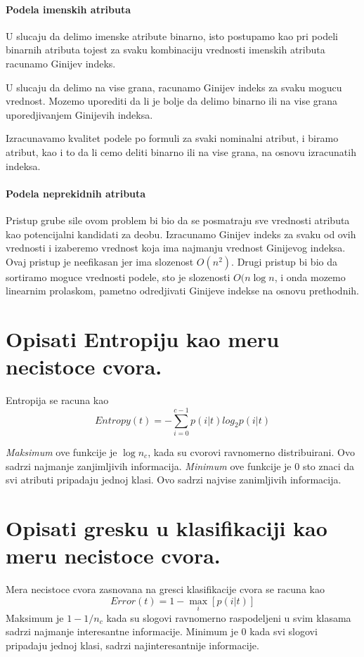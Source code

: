 \documentclass[a4paper]{article}
\begin{document}
\paragraph{Podela imenskih atributa} U slucaju da delimo imenske atribute binarno, isto postupamo
kao pri podeli binarnih atributa tojest za svaku kombinaciju vrednosti imenskih atributa racunamo
Ginijev indeks.

U slucaju da delimo na vise grana, racunamo Ginijev indeks za svaku mogucu vrednost. Mozemo
uporediti da li je bolje da delimo binarno ili na vise grana uporedjivanjem Ginijevih indeksa.

Izracunavamo kvalitet podele po formuli za svaki nominalni atribut, i biramo atribut, kao i to da li
cemo deliti binarno ili na vise grana, na osnovu izracunatih indeksa.

\paragraph{Podela neprekidnih atributa} Pristup grube sile ovom problem bi bio da se posmatraju sve
vrednosti atributa kao potencijalni kandidati za deobu. Izracunamo Ginijev indeks za svaku od ovih
vrednosti i izaberemo vrednost koja ima najmanju vrednost Ginijevog indeksa. Ovaj pristup je
neefikasan jer ima slozenost \(O(n^2)\). Drugi pristup bi bio da sortiramo moguce vrednosti podele,
sto je slozenosti \(O(n\log n\), i onda mozemo linearnim prolaskom, pametno odredjivati Ginijeve
indekse na osnovu prethodnih.

\section{Opisati Entropiju kao meru necistoce cvora.}
Entropija se racuna kao
\[
    Entropy(t) = - \sum_{i=0}^{c-1} p(i|t)log_2 p(i|t)
\]

\emph{Maksimum} ove funkcije je \(\log n_c\), kada su cvorovi ravnomerno distribuirani. Ovo sadrzi
najmanje zanjimljivih informacija. \emph{Minimum} ove funkcije je \(0\) sto znaci da svi atributi
pripadaju jednoj klasi. Ovo sadrzi najvise zanimljivih informacija.

\section{Opisati gresku u klasifikaciji kao meru necistoce cvora.}
Mera necistoce cvora zasnovana na gresci klasifikacije cvora se racuna kao
\[
    Error(t) = 1 - \max_i[p(i|t)]
\]
Maksimum je \(1-1/n_c\) kada su slogovi ravnomerno raspodeljeni u svim klasama sadrzi najmanje
interesantne informacije. Minimum je \(0\) kada svi slogovi pripadaju jednoj klasi, sadrzi
najinteresantnije informacije.
\end{document}
